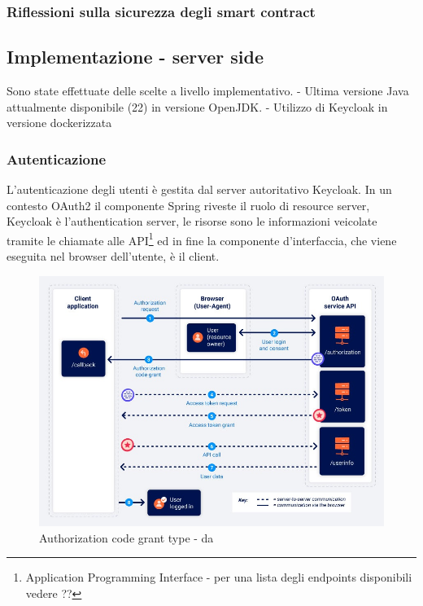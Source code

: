 \documentclass[a4paper,11pt]{article}
\newenvironment{longlisting}{\captionsetup{type=figure,labelformat=custom}}{}
\begin{document}
\subsubsection{Riflessioni sulla sicurezza degli smart contract} \label{par:openzeppelin}

%



\subsection{Implementazione - server side}

Sono state effettuate delle scelte a livello implementativo.
- Ultima versione Java attualmente disponibile (22) in versione OpenJDK.
- Utilizzo di Keycloak in versione dockerizzata


\subsubsection{Autenticazione}
L'autenticazione degli utenti è gestita dal server autoritativo Keycloak. In un contesto OAuth2 il componente Spring riveste il ruolo di resource server, Keycloak è l'authentication server, le risorse sono le informazioni veicolate tramite le chiamate alle API\footnote{Application Programming Interface - per una lista degli endpoints disponibili vedere ?? } ed in fine la componente d'interfaccia, che viene eseguita nel browser dell'utente, è il client.

\begin{figure}[H]
  \includegraphics[width=1\linewidth]{img/oauth-authorization-code-flow.jpg}
  \caption{Authorization code grant type - da \cite{portswiggerOAuthGrant}}
  \label{fig:flussoportswigger}
\end{figure}
\end{document}
